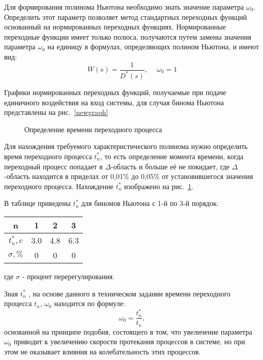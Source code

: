 Для формирования полинома Ньютона необходимо знать значение параметра $\omega_0$.  Определить этот параметр позволяет метод стандартных переходных функций основанный на нормированных переходных функциях. Нормированные переходные функции имеет только полюса, получаются путем замены значения параметра $\omega_0$ на единицу в формулах, определяющих полином Ньютона, и имеют вид:
\begin{equation}
	W(s) = \frac{1}{D^*(s)}, \phantom{-} \omega_0=1
\end{equation}

Графики нормированных переходных функций, получаемые при подаче единичного воздействия на вход системы, для случая бинома Ньютона представлены на рис.~\ref{newgraph}

\begin{figure}[h]
	\noindent{}
	\caption{Определение времени переходного процесса }
	\label{newtime}
\end{figure}

Для нахождения требуемого характеристического полинома нужно определить время переходного процесса $t_n^*$, то есть определение момента времени, когда переходный процесс попадает в $\Delta$-область и больше её не покидает, где $\Delta$-область находится в приделах от 0,01\% до 0,05\% от установившегося значения переходного процесса. Нахождение  $t_n^*$ изображено на рис.~\ref{newtime}.

В таблице приведены $t_n^*$ для биномов Ньютона с 1-й по 3-й порядок:
\begin{center}
\begin{tabular}{ |c|c|c|c| } 
 \hline
 n &  1 & 2 & 3  \\ 
 \hline
 $t_n^*, c$ &  3.0 & 4.8 & 6.3  \\ 
 \hline
 $\sigma, \%$ &  0 & 0 & 0  \\ 
 \hline
\end{tabular}
\end{center}
где $\sigma$ - процент перерегулирования. 

Зная $t_n^*$ , на основе данного в техническом задании времени переходного процесса $t_n$, $\omega_0$ находится по формуле: 
\begin{equation}\label{omeganul}
	\omega_0=\frac{t_n^*}{t_n},
\end{equation}
основанной на принципе подобия, состоящего в том, что увеличение параметра $\omega_0$ приводит к увеличению скорости протекания процессов в системе, но при этом не оказывает влияния на колебательность этих процессов.

